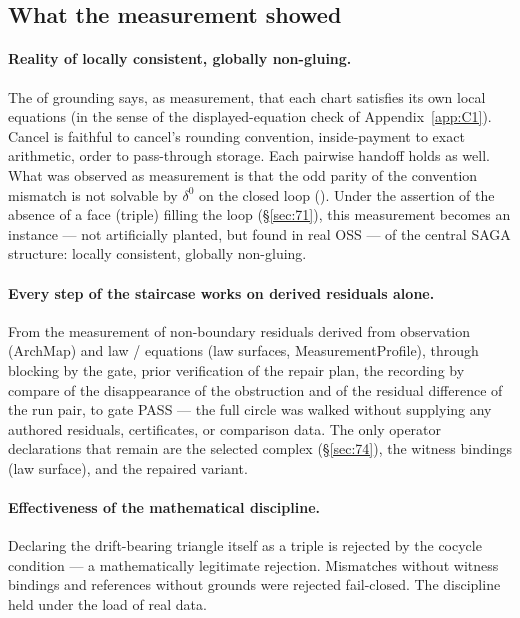 \subsection{What the measurement showed}\label{sec:73}

\paragraph{Reality of locally consistent, globally non-gluing.}
The  of grounding says, as measurement, that each
chart satisfies its own local equations (in the sense of the
displayed-equation check of Appendix~\ref{app:C1}). Cancel is faithful to
cancel's rounding convention, inside-payment to exact arithmetic,
order to pass-through storage. Each pairwise handoff holds as well.
What was observed as measurement is that the odd parity of the
convention mismatch is not solvable by $\delta^0$ on the closed loop
(). Under the assertion of the absence of a face
(triple) filling the loop (\S\ref{sec:71}), this measurement becomes
an instance --- not artificially planted, but found in real OSS --- of
the central SAGA structure: locally consistent, globally non-gluing.

\paragraph{Every step of the staircase works on derived residuals alone.}
From the measurement of non-boundary residuals derived from
observation (ArchMap) and law / equations (law surfaces,
MeasurementProfile), through blocking by the gate, prior verification
of the repair plan, the recording by compare of the disappearance of
the obstruction and of the residual difference of the run pair, to
gate PASS --- the full circle was walked without supplying any
authored residuals, certificates, or comparison data. The only operator
declarations that remain are the selected complex (\S\ref{sec:74}),
the witness bindings (law surface), and the repaired variant.

\paragraph{Effectiveness of the mathematical discipline.}
Declaring the drift-bearing triangle itself as a triple is rejected by
the cocycle condition --- a mathematically legitimate rejection.
Mismatches without witness bindings and references without grounds
were rejected fail-closed. The discipline held under the load of real data.

